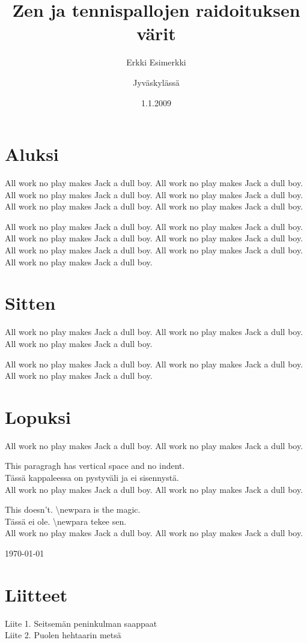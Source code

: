 \documentclass{vakioasiakirja}
\author{Erkki Esimerkki}
\date{1.1.2009}
\title{Zen ja tennispallojen raidoituksen värit}
\newcommand{\newpara}{\vspace{2ex}\noindent}
\begin{document}
\maketitle

\section{Aluksi}

\align All work no play makes Jack a dull boy. All work no play makes Jack a dull boy. All work no play makes Jack a dull boy. All work no play makes Jack a dull boy. All work no play makes Jack a dull boy. All work no play makes Jack a dull boy.

 All work no play makes Jack a dull boy. All work no play makes Jack a dull boy. All work no play makes Jack a dull boy. All work no play makes Jack a dull boy. All work no play makes Jack a dull boy. All work no play makes Jack a dull boy. All work no play makes Jack a dull boy.

\section{Sitten}

\align All work no play makes Jack a dull boy. All work no play makes Jack a dull boy. All work no play makes Jack a dull boy. 

All work no play makes Jack a dull boy. All work no play makes Jack a dull boy. All work no play makes Jack a dull boy.

\section{Lopuksi}

\align All work no play makes Jack a dull boy. All work no play makes Jack a dull boy.

\newpara This paragragh has vertical space and no indent.\\
Tässä kappaleessa on pystyväli ja ei sisennystä.\\
All work no play makes Jack a dull boy. All work no play makes Jack a dull boy.

This doesn't. \textbackslash newpara is the magic.\\
Tässä ei ole.  \textbackslash newpara tekee sen.\\
All work no play makes Jack a dull boy. All work no play makes Jack a dull boy.

\signature{Jyväskylässä}{\today}

\vfill

\section{Liitteet}

\align
Liite 1. Seitsemän peninkulman saappaat \\
Liite 2. Puolen hehtaarin metsä

\nopagenum
\end{document}
